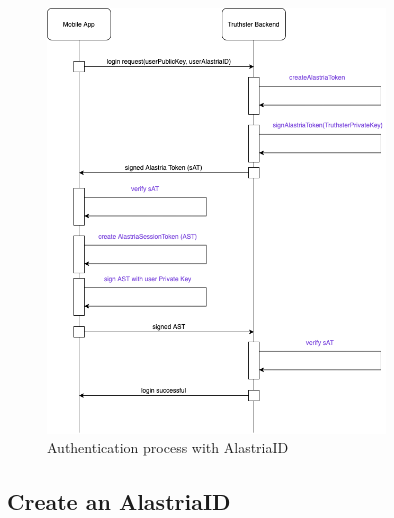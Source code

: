 \documentclass[target=mst,aauheader=]{thud}
\begin{document}
\begin{figure}
    \centering
    \includegraphics[width=0.8\textwidth]{images/authenticationAlastriaID.png}
    \caption{Authentication process with AlastriaID}
\end{figure}


\subsection{Create an AlastriaID}
\end{document}
